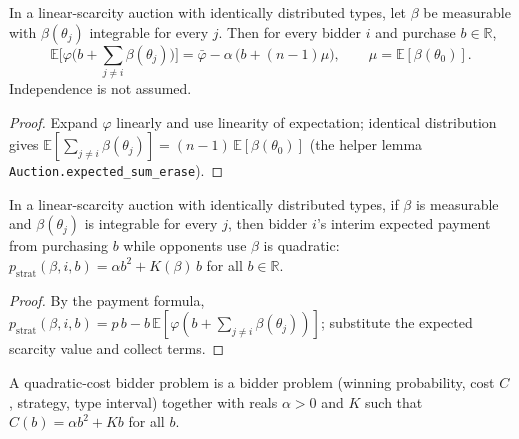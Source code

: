 \begin{theorem}\label{thm:MathEconLib.LinearScarcityAuction.expected_scarcity_linear}
\leanok
{}
In a linear-scarcity auction with identically distributed types, let $\beta$ be measurable with $\beta(\theta_j)$ integrable for every $j$. Then for every bidder $i$ and purchase $b \in \mathbb R$,
\[
  \mathbb E\Big[\varphi\Big(b + \sum_{j \ne i} \beta(\theta_j)\Big)\Big] = \bar\varphi - \alpha\,\big(b + (n-1)\mu\big), \qquad \mu = \mathbb E[\beta(\theta_0)].
\]
Independence is not assumed.
\end{theorem}
\begin{proof}
\leanok
{}
Expand $\varphi$ linearly and use linearity of expectation; identical distribution gives $\mathbb E[\sum_{j \ne i}\beta(\theta_j)] = (n-1)\,\mathbb E[\beta(\theta_0)]$ (the helper lemma \texttt{Auction.expected\_sum\_erase}).
\end{proof}

\begin{theorem}\label{thm:MathEconLib.LinearScarcityAuction.p_strat_eq_quadratic}
\leanok
{}
In a linear-scarcity auction with identically distributed types, if $\beta$ is measurable and $\beta(\theta_j)$ is integrable for every $j$, then bidder $i$'s interim expected payment from purchasing $b$ while opponents use $\beta$ is quadratic: $p_{\mathrm{strat}}(\beta, i, b) = \alpha b^2 + K(\beta)\, b$ for all $b \in \mathbb R$.
\end{theorem}
\begin{proof}
\leanok
{}
By the payment formula, $p_{\mathrm{strat}}(\beta,i,b) = p\,b - b\,\mathbb E[\varphi(b + \sum_{j\ne i}\beta(\theta_j))]$; substitute the expected scarcity value and collect terms.
\end{proof}

\begin{definition}\label{def:MathEconLib.QuadraticCostProblem}
\leanok
{}
A quadratic-cost bidder problem is a bidder problem (winning probability, cost $C$, strategy, type interval) together with reals $\alpha > 0$ and $K$ such that $C(b) = \alpha b^2 + K b$ for all $b$.
\end{definition}

